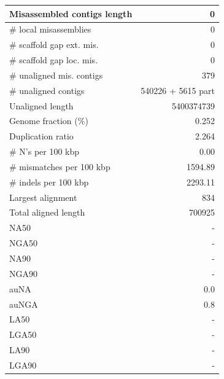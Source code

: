 \documentclass[12pt,a4paper]{article}
\begin{document}
\begin{table}[ht]
\begin{center}
\begin{tabular}{|l*{1}{|r}|}
Misassembled contigs length & 0 \\ \hline
\# local misassemblies & 0 \\ \hline
\# scaffold gap ext. mis. & 0 \\ \hline
\# scaffold gap loc. mis. & 0 \\ \hline
\# unaligned mis. contigs & 379 \\ \hline
\# unaligned contigs & 540226 + 5615 part \\ \hline
Unaligned length & 5400374739 \\ \hline
Genome fraction (\%) & 0.252 \\ \hline
Duplication ratio & 2.264 \\ \hline
\# N's per 100 kbp & 0.00 \\ \hline
\# mismatches per 100 kbp & 1594.89 \\ \hline
\# indels per 100 kbp & 2293.11 \\ \hline
Largest alignment & 834 \\ \hline
Total aligned length & 700925 \\ \hline
NA50 & - \\ \hline
NGA50 & - \\ \hline
NA90 & - \\ \hline
NGA90 & - \\ \hline
auNA & 0.0 \\ \hline
auNGA & 0.8 \\ \hline
LA50 & - \\ \hline
LGA50 & - \\ \hline
LA90 & - \\ \hline
LGA90 & - \\ \hline
\end{tabular}
\end{center}
\end{table}
\end{document}
